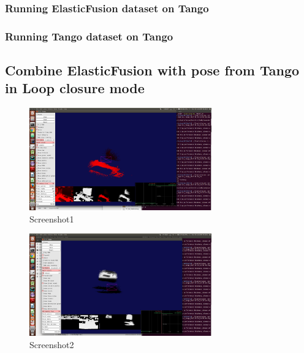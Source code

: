 \documentclass[12pt,twoside]{article}
\begin{document}
\subsubsection{Running ElasticFusion dataset on Tango}









\subsubsection{Running Tango dataset on Tango}












\newpage



\subsection{Combine ElasticFusion with pose from Tango in Loop closure mode}









\newpage






\begin{figure}[h]
    \centering
    \includegraphics[width=0.7\textwidth]{figures/Screenshot1}
    \caption{Screenshot1}
    \label{fig:Screenshot1}
\end{figure}

\begin{figure}[h]
    \centering
    \includegraphics[width=0.7\textwidth]{figures/Screenshot2}
    \caption{Screenshot2}
    \label{fig:Screenshot2}
\end{figure}
\end{document}

